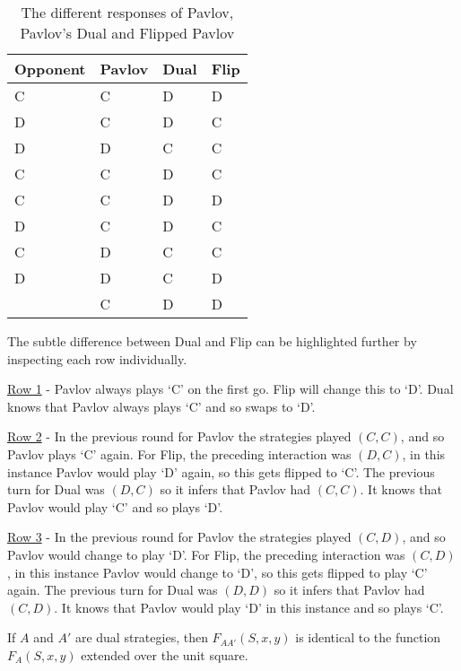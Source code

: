 \begin{table}[htbp]
\centering
\begin{tabular}{l l l l}
\toprule
Opponent & Pavlov & Dual & Flip \\
\midrule
C & C & D & D \\
D & C & D & C \\
D & D & C & C \\
C & C & D & C \\
C & C & D & D \\
D & C & D & C \\
C & D & C & C \\
D & D & C & D \\
  & C & D & D \\
\bottomrule
\end{tabular}
\caption{The different responses of Pavlov, Pavlov's Dual and Flipped Pavlov}
\label{tab:strat-dual-flip}
\end{table}

The subtle difference between Dual and Flip can be highlighted further by inspecting each row individually.

\underline{Row 1} - Pavlov always plays `C' on the first go.
Flip will change this to `D'.
Dual knows that Pavlov always plays `C' and so swaps to `D'.

\underline{Row 2} - In the previous round for Pavlov the strategies played $(C, C)$, and so Pavlov plays `C' again.
For Flip, the preceding interaction was $(D, C)$, in this instance Pavlov would play `D' again, so this gets flipped to `C'.
The previous turn for Dual was $(D, C)$ so it infers that Pavlov had $(C, C)$.
It knows that Pavlov would play `C' and so plays `D'.

\underline{Row 3} - In the previous round for Pavlov the strategies played $(C, D)$, and so Pavlov would change to play `D'.
For Flip, the preceding interaction was $(C, D)$, in this instance Pavlov would change to `D', so this gets flipped to play `C' again.
The previous turn for Dual was $(D, D)$ so it infers that Pavlov had $(C, D)$.
It knows that Pavlov would play `D' in this instance and so plays `C'.



\begin{theorem}\label{thm:fingerprint-unit-square}
If $A$ and $A'$ are dual strategies, then $F_{AA'}(S, x, y)$ is identical to the function $F_A(S, x, y)$ extended over the unit square.
\end{theorem}

